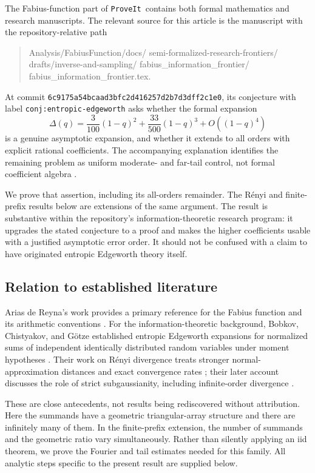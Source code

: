 \documentclass[11pt,a4paper]{article}
\numberwithin{equation}{section}
\theoremstyle{definition}
\theoremstyle{remark}
\newcommand{\repo}{\texttt{ProveIt}}
\newcommand{\commit}{\nolinkurl{6c9175a54bcaad3bfc2d416257d2b7d3dff2c1e0}}
\begin{document}
The Fabius-function part of \repo\ contains both formal mathematics and research
manuscripts. The relevant source for this article is the manuscript with the
repository-relative path
\begin{quote}\small\ttfamily\raggedright
Analysis/FabiusFunction/docs/\allowbreak
semi-formalized-research-frontiers/\allowbreak
drafts/inverse-and-sampling/\allowbreak
fabius\_information\_frontier/\allowbreak
fabius\_information\_frontier.tex.
\end{quote}
At commit \commit, its conjecture with label
\texttt{conj:entropic-edgeworth} asks whether the formal expansion
\begin{equation}
 \Delta(q)=\frac3{100}(1-q)^2+\frac{33}{500}(1-q)^3+O((1-q)^4)
 \label{eq:original}
\end{equation}
is a genuine asymptotic expansion, and whether it extends to all orders with
explicit rational coefficients. The accompanying explanation identifies the
remaining problem as uniform moderate- and far-tail control, not formal
coefficient algebra \cite{repo}.

We prove that assertion, including its all-orders remainder. The R\'enyi and
finite-prefix results below are extensions of the same argument. The result is
substantive within the repository's information-theoretic research program:
it upgrades the stated conjecture to a proof and makes the higher coefficients
usable with a justified asymptotic error order. It should not be confused with a
claim to have originated entropic Edgeworth theory itself.

\subsection{Relation to established literature}

Arias de Reyna's work provides a primary reference for the Fabius function and
its arithmetic conventions \cite{arias}. For the information-theoretic
background, Bobkov, Chistyakov, and G\"otze established entropic Edgeworth
expansions for normalized sums of independent identically distributed random
variables under moment hypotheses \cite{bcg2013}. Their work on R\'enyi
divergence treats stronger normal-approximation distances and exact convergence
rates \cite{bcg2016}; their later account discusses the role of strict
subgaussianity, including infinite-order divergence \cite{bcg2025}.

These are close antecedents, not results being rediscovered without attribution.
Here the summands have a geometric triangular-array structure and there are
infinitely many of them. In the finite-prefix extension, the number of summands
and the geometric ratio vary simultaneously. Rather than silently applying an
iid theorem, we prove the Fourier and tail estimates needed for this family.
All analytic steps specific to the present result are supplied below.
\end{document}
